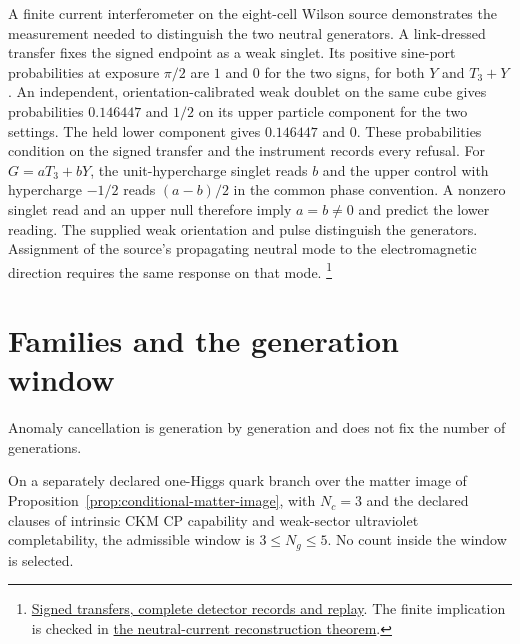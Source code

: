 \documentclass[11pt]{article}
\begin{document}
A finite current interferometer on the eight-cell Wilson source
demonstrates the measurement needed to distinguish the two neutral
generators. A link-dressed transfer fixes the signed endpoint as a weak
singlet. Its positive sine-port probabilities at exposure \(\pi/2\)
are \(1\) and \(0\) for the two signs, for both \(Y\) and \(T_3+Y\).
An independent, orientation-calibrated weak doublet on the same cube
gives probabilities \(0.146447\) and \(1/2\) on its upper particle
component for the two settings. The held lower component gives
\(0.146447\) and \(0\). These probabilities condition on the signed
transfer and the instrument records every refusal.
For \(G=aT_3+bY\), the unit-hypercharge singlet reads \(b\)
and the upper control with hypercharge \(-1/2\) reads
\((a-b)/2\) in the common phase convention. A nonzero singlet read and
an upper null therefore imply \(a=b\ne0\) and predict the lower
reading. The supplied weak orientation and pulse distinguish the
generators. Assignment of the source's propagating neutral mode
to the electromagnetic direction requires the same response on
that mode.%
\footnote{\href{https://github.com/FloatingPragma/observer-patch-holography/tree/main/model/candidate_laws/interval_echo/openwave/electron_field/lepton_family/theorem_interfaces/endpoint_current_probe}{Signed transfers, complete detector records and replay}.
The finite implication is checked in \href{https://github.com/FloatingPragma/observer-patch-holography/blob/main/model/candidate_laws/interval_echo/openwave/electron_field/lepton_family/theorem_interfaces/EndpointNeutralDirection.lean}{the neutral-current reconstruction theorem}.}

\section{Families and the generation window}
\label{sec:families}

Anomaly cancellation is generation by generation and does not fix the number
of generations.

\begin{proposition}
\label{prop:generation-window}
On a separately declared one-Higgs quark branch over the matter image of
Proposition~\ref{prop:conditional-matter-image}, with \(N_c=3\) and the
declared clauses of intrinsic CKM CP capability and weak-sector ultraviolet
completability, the admissible window is \(3\le N_g\le5\). No count inside
the window is selected.
\end{proposition}
\end{document}
